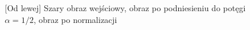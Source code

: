 \documentclass[a4paper,12pt, titlepage]{report}
\begin{document}
\FloatBarrier
\begin{figure}[h]
    \centering
    \caption{[Od lewej] Szary obraz wejściowy, obraz po podniesieniu do potęgi \(\alpha=1/2\), obraz po normalizacji}%
    \label{fig:rysunek}%
\end{figure}
\FloatBarrier
\end{document}
